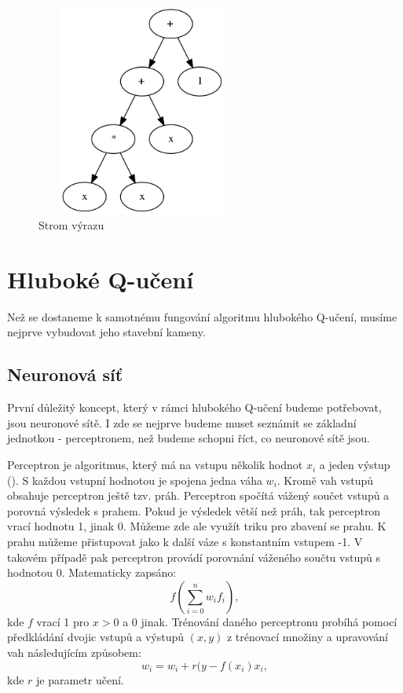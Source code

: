 \begin{figure}[H]\centering
\includegraphics[width=70mm, height=70mm]{./Obrazky/formule_graph_2.png}
\caption{Strom výrazu}
\label{obr04:GrafFormule}
\end{figure}



\newpage
\section{Hluboké Q-učení}
Než se dostaneme k samotnému fungování algoritmu hlubokého Q-učení, musíme nejprve vybudovat jeho stavební kameny.

\subsection{Neuronová síť}
První důležitý koncept, který v rámci hlubokého Q-učení budeme potřebovat, jsou neuronové sítě. 
I zde se nejprve budeme muset seznámit se základní jednotkou - perceptronem, než budeme schopni říct, co neuronové sítě jsou.
\par
Perceptron je algoritmus, který má na vstupu několik hodnot $x_i$ a jeden výstup (\cite{perceptronNeuralNetworks}). S každou vstupní hodnotou je spojena jedna váha $w_i$.
Kromě vah vstupů obsahuje perceptron ještě tzv. práh. Perceptron spočítá vážený součet vstupů a porovná výsledek s prahem. Pokud je výsledek větší než práh, tak perceptron vrací hodnotu 1, jinak 0.
Můžeme zde ale využít triku pro zbavení se prahu. K prahu můžeme přistupovat jako k další váze s konstantním vstupem -1.
V takovém případě pak perceptron provádí porovnání váženého součtu vstupů s hodnotou 0. 
\newline
Matematicky zapsáno:
\[f(\sum_{i=0}^{n} w_if_i),\] kde $f$ vrací 1 pro $x>0$ a 0 jinak.
Trénování daného perceptronu probíhá pomocí předkládání dvojic vstupů a výstupů $(x,y)$ z trénovací množiny a upravování vah následujícím způsobem:
\newline
\[w_i = w_i + r(y-f(x_i)x_i,\] kde $r$ je parametr učení.

